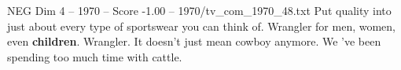 \begin{textsample}{NEG Dim 4 – 1970 – Score -1.00 – 1970/tv\_com\_1970\_48.txt}  \label{ex:f4_neg_059}
Put quality into just about every type of sportswear you can think of.
Wrangler for men, women, even \textbf{children}.
Wrangler.
It doesn't just mean cowboy anymore.
We 've been spending too much time with cattle.

\end{textsample}

